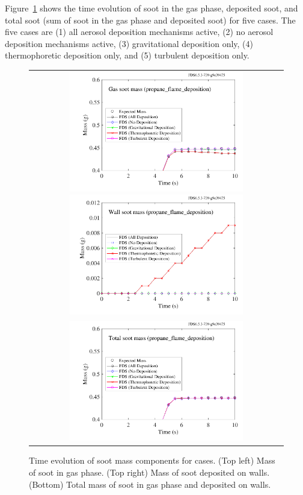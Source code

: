 \documentclass[11pt]{book}
\begin{document}
Figure~\ref{fig:deposition_mass} shows the time evolution of soot in the gas phase, deposited soot, and total soot (sum of soot in the gas phase and deposited soot) for five cases. The five cases are (1) all aerosol deposition mechanisms active, (2) no aerosol deposition mechanisms active, (3) gravitational deposition only, (4) thermophoretic deposition only, and (5) turbulent deposition only.

\begin{figure}[ht]
\centering
\begin{tabular}{c}
\includegraphics[width=3.0in]{SCRIPT_FIGURES/propane_flame_deposition_gas}
\includegraphics[width=3.0in]{SCRIPT_FIGURES/propane_flame_deposition_wall} \\
\includegraphics[width=3.0in]{SCRIPT_FIGURES/propane_flame_deposition_total}
\end{tabular}
\caption[Soot mass conservation for  case]{Time evolution of soot mass components for  cases. (Top left) Mass of soot in gas phase. (Top right) Mass of soot deposited on walls. (Bottom) Total mass of soot in gas phase and deposited on walls.}
\label{fig:deposition_mass}
\end{figure}
\end{document}
